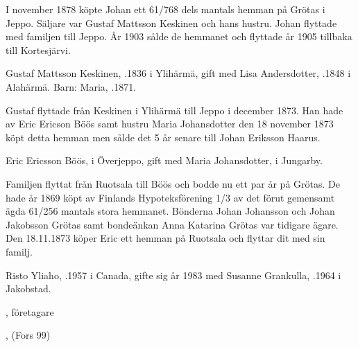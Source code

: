 I november 1878 köpte Johan ett 61/768 dels mantals hemman på Grötas i Jeppo. Säljare var Gustaf Mattsson Keskinen och hans hustru. Johan flyttade med familjen till Jeppo. År 1903 sålde de hemmanet och flyttade år 1905 tillbaka till Kortesjärvi.


%
Gustaf Mattsson Keskinen, .1836  i Ylihärmä, gift med Lisa Andersdotter, .1848 i Alahärmä.
Barn: Maria, .1871.

Gustaf flyttade från Keskinen i Ylihärmä till Jeppo i december 1873. Han hade av Eric Ericson Böös samt hustru Maria Johansdotter den 18 november 1873 köpt detta hemman men sålde det 5 år senare till Johan Eriksson Haarus.


%
Eric Ericsson Böös,  i Överjeppo, gift med Maria Johansdotter,  i Jungarby.
\begin{jhchildren}
  \item {}
  \item {}
\end{jhchildren}

Familjen flyttat från Ruotsala till Böös och bodde nu ett par år på Grötas. De hade år 1869 köpt av Finlands Hypoteksförening 1/3 av det förut gemensamt ägda 61/256 mantals stora hemmanet. Bönderna Johan Johansson och Johan Jakobsson Grötas samt bondeänkan Anna Katarina Grötas var tidigare ägare. Den 18.11.1873 köper Eric ett hemman på Ruotsala och flyttar dit med sin familj.



%



%
Risto Yliaho, .1957 i Canada, gifte sig år 1983 med Susanne Grankulla, .1964 i Jakobstad.
\begin{jhchildren}
  \item {}, företagare
  \item {}, (Fors 99)
\end{jhchildren}

